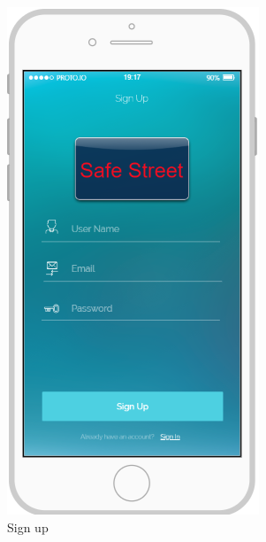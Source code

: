 \documentclass{article}
\begin{document}
\begin{figure}[H]
				\begin{subfigure}[H]{0.25\linewidth}
					\includegraphics[width=\linewidth]{Images/Sign_Up.png}
					\caption{Sign up}
				\end{subfigure}
				\begin{subfigure}[H]{0.25\linewidth}

\end{subfigure}
\end{figure}
\end{document}
